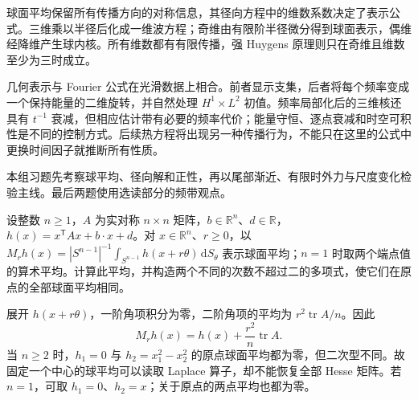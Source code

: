 




\begin{chaptersummary}
球面平均保留所有传播方向的对称信息，其径向方程中的维数系数决定了表示公式。三维乘以半径后化成一维波方程；奇维由有限阶半径微分得到球面表示，偶维经降维产生球内核。所有维数都有有限传播，强 Huygens 原理则只在奇维且维数至少为三时成立。

\ProseParagraphBreak

几何表示与 Fourier 公式在光滑数据上相合。前者显示支集，后者将每个频率变成一个保持能量的二维旋转，并自然处理 \(H^1\times L^2\) 初值。频率局部化后的三维核还具有 \(t^{-1}\) 衰减，但相应估计带有必要的频率代价；能量守恒、逐点衰减和时空可积性是不同的控制方式。后续热方程将出现另一种传播行为，不能只在这里的公式中更换时间因子就推断所有性质。
\end{chaptersummary}

\BookExercises

本组习题先考察球平均、径向解和正性，再以尾部渐近、有限时外力与尺度变化检验主线。最后两题使用选读部分的频带观点。

\begin{exercise}\label{b2:ex:11-quadratic-mean}
设整数 \(n\geq1\)，\(A\) 为实对称 \(n\times n\) 矩阵，\(b\in\mathbb R^n\)、\(d\in\mathbb R\)，\(h(x)=x^{\mathsf T}Ax+b\cdot x+d\)。对 \(x\in\mathbb R^n\)、\(r\geq0\)，以 \(M_rh(x)=|S^{n-1}|^{-1}\int_{S^{n-1}}h(x+r\theta)\,\mathrm dS_\theta\) 表示球面平均；\(n=1\) 时取两个端点值的算术平均。计算此平均，并构造两个不同的次数不超过二的多项式，使它们在原点的全部球面平均相同。
\end{exercise}
\begin{solution}
展开 \(h(x+r\theta)\)，一阶角项积分为零，二阶角项的平均为 \(r^2\operatorname{tr}A/n\)。因此
\[
 M_rh(x)=h(x)+\dfrac{r^2}{n}\operatorname{tr}A.
\]
当 \(n\geq2\) 时，\(h_1=0\) 与 \(h_2=x_1^2-x_2^2\) 的原点球面平均都为零，但二次型不同。故固定一个中心的球平均可以读取 Laplace 算子，却不能恢复全部 Hesse 矩阵。若 \(n=1\)，可取 \(h_1=0\)、\(h_2=x\)；关于原点的两点平均也都为零。
\end{solution}

